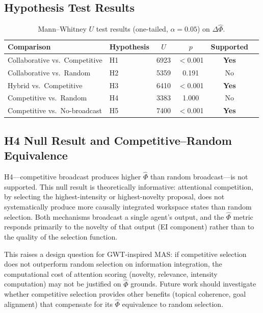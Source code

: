 \documentclass[11pt]{article}
\theoremstyle{definition}
\begin{document}
\subsection{Hypothesis Test Results}

\begin{table}[h]
\caption{Mann--Whitney $U$ test results (one-tailed, $\alpha = 0.05$) on $\Delta\hat{\Phi}$.}
\label{tab:tests}
\centering
\begin{tabular}{llcccc}
\toprule
\textbf{Comparison} & \textbf{Hypothesis} & \textbf{$U$} & \textbf{$p$} & \textbf{Supported} \\
\midrule
Collaborative vs.\ Competitive & H1 & 6923 & $<$0.001 & \textbf{Yes} \\
Collaborative vs.\ Random      & H2 & 5359 & 0.191   & No \\
Hybrid vs.\ Competitive        & H3 & 6410 & $<$0.001 & \textbf{Yes} \\
Competitive vs.\ Random        & H4 & 3383 & 1.000   & No \\
Competitive vs.\ No-broadcast  & H5 & 7400 & $<$0.001 & \textbf{Yes} \\
\bottomrule
\end{tabular}
\end{table}

\subsection{H4 Null Result and Competitive--Random Equivalence}

H4---competitive broadcast produces higher $\hat{\Phi}$ than random broadcast---is not
supported. This null result is theoretically informative: attentional competition, by
selecting the highest-intensity or highest-novelty proposal, does not systematically
produce more causally integrated workspace states than random selection. Both mechanisms
broadcast a single agent's output, and the $\hat{\Phi}$ metric responds primarily to the
novelty of that output (EI component) rather than to the quality of the selection function.

This raises a design question for GWT-inspired MAS: if competitive selection does not
outperform random selection on information integration, the computational cost of attention
scoring (novelty, relevance, intensity computation) may not be justified on $\hat{\Phi}$
grounds. Future work should investigate whether competitive selection provides other benefits
(topical coherence, goal alignment) that compensate for its $\hat{\Phi}$ equivalence to
random selection.
\end{document}
